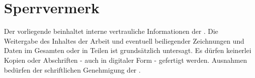 
\chapter*{Sperrvermerk}

\thispagestyle{empty}

Der vorliegende {\art} beinhaltet interne vertrauliche Informationen der  \firma{}. Die Weitergabe des Inhaltes der Arbeit und eventuell beiliegender Zeichnungen und Daten im Gesamten oder in Teilen ist grunds\"atzlich untersagt. Es dürfen keinerlei Kopien oder Abschriften - auch in digitaler Form - gefertigt werden. Ausnahmen bed\"urfen der schriftlichen Genehmigung der  \firma{}.